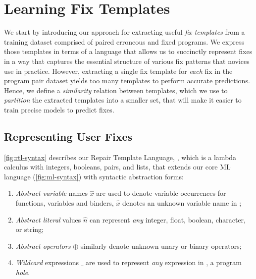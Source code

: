 \section{Learning Fix Templates}
\label{sec:templ-partition}

We start by introducing our approach for extracting useful \emph{fix templates}
from a training dataset comprised of paired erroneous and fixed programs.
%
We express those templates in terms of a language that allows us to succinctly
represent fixes in a way that captures the essential structure of various fix
patterns that novices use in practice.
%
However, extracting a single fix template for \emph{each} fix in the program
pair dataset yields too many templates to perform accurate predictions.
%
Hence, we define a \emph{similarity} relation between templates, which we use to
\emph{partition} the extracted templates into a smaller set, that will make it
easier to train precise models to predict fixes.



\subsection{Representing User Fixes}
\label{sec:templ-partition:lang}

\autoref{fig:rtl-syntax} describes our Repair Template Language, \repairLang,
which is a lambda calculus with integers, booleans, pairs, and lists, that
extends our core ML language \lang (\autoref{fig:ml-syntax}) with
syntactic abstraction forms:

\begin{enumerate}
    \item \emph{Abstract variable} names $\hat{x}$  are used to denote variable
    occurrences for functions, variables and binders, \ie $\hat{x}$ denotes
    an unknown variable name in \repairLang;

    \item \emph{Abstract literal} values $\hat{n}$ can represent \emph{any}
    integer, float, boolean, character, or string;

    \item \emph{Abstract operators} $\oplus$ similarly denote unknown unary or
    binary operators;

    \item \emph{Wildcard} expressions $\_$ are used to represent \emph{any}
    expression in \repairLang, \ie a program \emph{hole}.
\end{enumerate}

